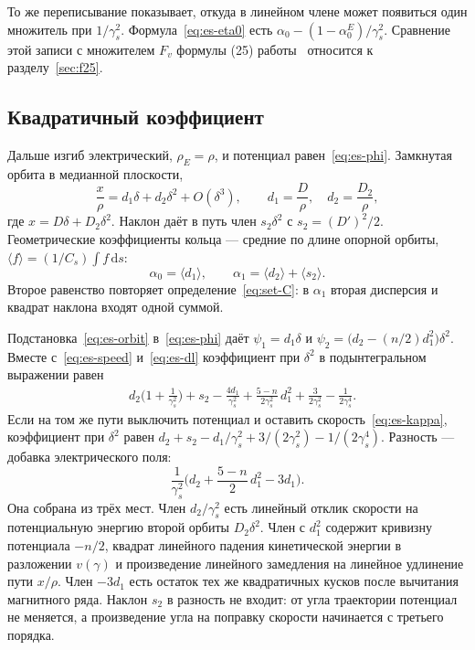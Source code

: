 То же переписывание показывает, откуда в линейном члене может появиться один множитель при $1/\gamma_s^2$. Формула~\eqref{eq:es-eta0} есть $\alpha_0-(1-\alpha_0^{E})/\gamma_s^2$. Сравнение этой записи с множителем $F_v$ формулы (25) работы~\cite{Senichev2013} относится к разделу~\ref{sec:f25}.

\subsection{Квадратичный коэффициент}
\label{sec:es-eta1}

Дальше изгиб электрический, $\rho_E=\rho$, и потенциал равен~\eqref{eq:es-phi}. Замкнутая орбита в медианной плоскости,
\begin{equation}
\label{eq:es-orbit}
\frac{x}{\rho}=d_1\delta+d_2\delta^2+O(\delta^3),
\qquad d_1=\frac{D}{\rho},\quad d_2=\frac{D_2}{\rho},
\end{equation}
где $x=D\delta+D_2\delta^2$. Наклон даёт в путь член $s_2\delta^2$ с $s_2=(D')^2/2$. Геометрические коэффициенты кольца --- средние по длине опорной орбиты, $\langle f\rangle=(1/C_s)\int f\,\mathrm{d}s$:
\begin{equation}
\label{eq:es-alpha}
\alpha_0=\langle d_1\rangle,
\qquad
\alpha_1=\langle d_2\rangle+\langle s_2\rangle.
\end{equation}
Второе равенство повторяет определение~\eqref{eq:set-C}: в $\alpha_1$ вторая дисперсия и квадрат наклона входят одной суммой.

Подстановка~\eqref{eq:es-orbit} в~\eqref{eq:es-phi} даёт $\psi_1=d_1\delta$ и $\psi_2=\bigl(d_2-(n/2)d_1^2\bigr)\delta^2$. Вместе с~\eqref{eq:es-speed} и~\eqref{eq:es-dl} коэффициент при $\delta^2$ в подынтегральном выражении равен
\begin{equation}
\label{eq:es-eta1loc}
\begin{aligned}
&d_2\Biggl(1+\frac{1}{\gamma_s^2}\Biggr)+s_2
-\frac{4d_1}{\gamma_s^2}
+\frac{5-n}{2\gamma_s^2}\,d_1^2
+\frac{3}{2\gamma_s^2}-\frac{1}{2\gamma_s^4}.
\end{aligned}
\end{equation}
Если на том же пути выключить потенциал и оставить скорость~\eqref{eq:es-kappa}, коэффициент при $\delta^2$ равен $d_2+s_2-d_1/\gamma_s^2+3/(2\gamma_s^2)-1/(2\gamma_s^4)$. Разность --- добавка электрического поля:
\begin{equation}
\label{eq:es-extra}
\frac{1}{\gamma_s^2}\Biggl(d_2+\frac{5-n}{2}\,d_1^2-3d_1\Biggr).
\end{equation}
Она собрана из трёх мест. Член $d_2/\gamma_s^2$ есть линейный отклик скорости на потенциальную энергию второй орбиты $D_2\delta^2$. Член с $d_1^2$ содержит кривизну потенциала $-n/2$, квадрат линейного падения кинетической энергии в разложении $v(\gamma)$ и произведение линейного замедления на линейное удлинение пути $x/\rho$. Член $-3d_1$ есть остаток тех же квадратичных кусков после вычитания магнитного ряда. Наклон $s_2$ в разность не входит: от угла траектории потенциал не меняется, а произведение угла на поправку скорости начинается с третьего порядка.

